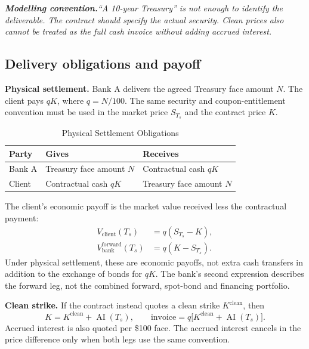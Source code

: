 \documentclass[11pt]{article}
\newcommand{\warningbox}[1]{\par\medskip\noindent\textit{\textbf{Modelling convention.}\enspace #1}\par\medskip}
\newcommand{\AI}{\operatorname{AI}}
\numberwithin{equation}{section}
\begin{document}
\warningbox{``A 10-year Treasury'' is not enough to identify the deliverable. The contract should specify the actual security. Clean prices also cannot be treated as the full cash invoice without adding accrued interest.}

\subsection{Delivery obligations and payoff}
\textbf{Physical settlement.} Bank A delivers the agreed Treasury face amount $N$. The client pays $qK$, where $q=N/100$. The same security and coupon-entitlement convention must be used in the market price $S_{T_s}$ and the contract price $K$.

\begin{center}
\begin{table}[H]
\centering
\caption{Physical Settlement Obligations}
\label{tab:solution-3}
\small
\begin{tabularx}{\textwidth}{@{}L{2cm}YY@{}}
\toprule{}\textbf{Party} & \textbf{Gives} & \textbf{Receives}\\\midrule
Bank A & Treasury face amount $N$ & Contractual cash $qK$\\
Client & Contractual cash $qK$ & Treasury face amount $N$\\\bottomrule
\end{tabularx}
\end{table}
\end{center}

The client's economic payoff is the market value received less the contractual payment:
\begin{align}
V_{\mathrm{client}}(T_s)&=q(S_{T_s}-K),\\
V_{\mathrm{bank}}^{\mathrm{forward}}(T_s)&=q(K-S_{T_s}).
\end{align}
Under physical settlement, these are economic payoffs, not extra cash transfers in addition to the exchange of bonds for $qK$. The bank's second expression describes the forward leg, not the combined forward, spot-bond and financing portfolio.

\textbf{Clean strike.} If the contract instead quotes a clean strike $K^{\mathrm{clean}}$, then
\begin{equation}
K=K^{\mathrm{clean}}+\AI(T_s),\qquad
\text{invoice}=q\bigl[K^{\mathrm{clean}}+\AI(T_s)\bigr].
\end{equation}
Accrued interest is also quoted per \$100 face. The accrued interest cancels in the price difference only when both legs use the same convention.
\end{document}
